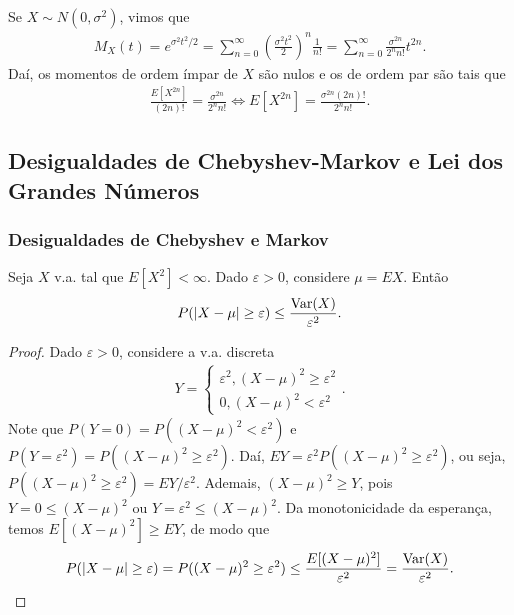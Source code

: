 \documentclass[../Notas.tex]{subfiles}
\begin{document}
\begin{example}
Se $X\sim N(0, \sigma^2)$, vimos que
\begin{align*}
    M_X(t) = e^{\sigma^2t^2/2} = \sum_{n=0}^{\infty} \left( \frac{\sigma^2 t^2}{2} \right)^n\frac{1}{n!} = \sum_{n=0}^{\infty} \frac{\sigma^{2n}}{2^n n!}t^{2n}.
\end{align*}
Daí, os momentos de ordem ímpar de $X$ são nulos e os de ordem par são tais que
\begin{align*}
    \frac{E[X^{2n}]}{(2n)!} = \frac{\sigma^{2n}}{2^n n!} \iff E[X^{2n}] = \frac{\sigma^{2n}(2n)!}{2^n n!}.
\end{align*}
\end{example}

\subsection{Desigualdades de Chebyshev-Markov e Lei dos Grandes Números}

\subsubsection{Desigualdades de Chebyshev e Markov}
\begin{proposition}
Seja $X$ v.a. tal que $E[X^2] < \infty$. Dado $\varepsilon > 0$, considere $\mu = EX$. Então
\begin{align*}
    P(|X - \mu|\geq\varepsilon) \leq \frac{\text{Var}(X)}{\varepsilon^2}.
\end{align*}
\end{proposition}

\begin{proof}
Dado $\varepsilon > 0$, considere a v.a. discreta
\begin{align*}
    Y = \begin{cases}
    \varepsilon^2, (X-\mu)^2\geq\varepsilon^2 \\
    0, (X-\mu)^2 < \varepsilon^2
    \end{cases}.
\end{align*}
Note que $P(Y=0) = P((X-\mu)^2 < \varepsilon^2)$ e $P(Y=\varepsilon^2) = P((X-\mu)^2 \geq \varepsilon^2)$. Daí, $EY = \varepsilon^2 P((X-\mu)^2 \geq \varepsilon^2)$, ou seja, $P((X-\mu)^2 \geq \varepsilon^2) = EY/\varepsilon^2$. Ademais, $(X-\mu)^2\geq Y$, pois $Y = 0 \leq (X-\mu)^2$ ou $Y = \varepsilon^2\leq(X-\mu)^2$. Da monotonicidade da esperança, temos $E[(X-\mu)^2]\geq EY$, de modo que
\begin{align*}
    P(|X-\mu| \geq \varepsilon) = P((X-\mu)^2 \geq \varepsilon^2) \leq \frac{E[(X-\mu)^2]}{\varepsilon^2} = \frac{\text{Var}(X)}{\varepsilon^2}.
\end{align*}
\end{proof}
\end{document}
